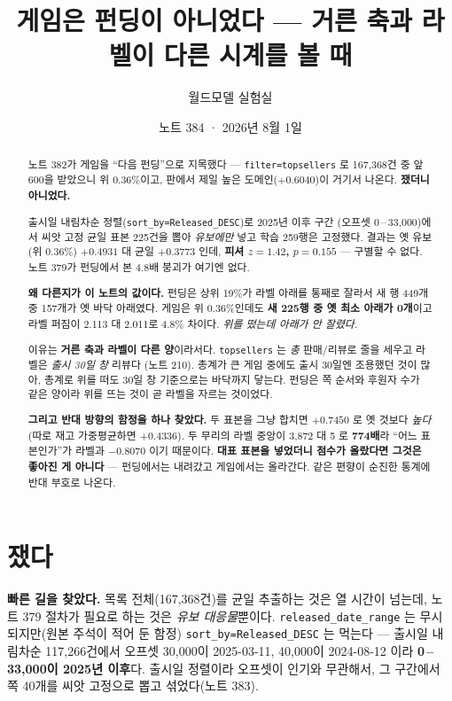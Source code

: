 \documentclass[11pt]{article}
\begin{document}
\title{게임은 펀딩이 아니었다 --- 거른 축과 라벨이 다른 시계를 볼 때}
\author{월드모델 실험실}
\date{노트 384 · 2026년 8월 1일}
\maketitle

\begin{abstract}
노트 382가 게임을 ``다음 펀딩''으로 지목했다 ---
\texttt{filter=topsellers} 로 167,368건 중 앞 600을 받았으니 위 0.36\%이고,
판에서 제일 높은 도메인($+0.6040$)이 거기서 나온다. \textbf{쟀더니 아니었다.}

출시일 내림차순 정렬(\texttt{sort\_by=Released\_DESC})로 2025년 이후 구간
(오프셋 0\,--\,33,000)에서 씨앗 고정 균일 표본 225건을 뽑아 \emph{유보에만}
넣고 학습 259행은 고정했다. 결과는 옛 유보(위 0.36\%) $+0.4931$ 대 균일
$+0.3773$ 인데, \textbf{피셔 $z=1.42$, $p=0.155$} --- 구별할 수 없다.
노트 379가 펀딩에서 본 4.8배 붕괴가 여기엔 없다.

\textbf{왜 다른지가 이 노트의 값이다.} 펀딩은 상위 19\%가 라벨 아래를
통째로 잘라서 새 행 449개 중 157개가 옛 바닥 아래였다. 게임은 위
0.36\%인데도 \textbf{새 225행 중 옛 최소 아래가 0개}이고 라벨 퍼짐이
2.113 대 2.011로 4.8\% 차이다. \emph{위를 떴는데 아래가 안 잘렸다.}

이유는 \textbf{거른 축과 라벨이 다른 양}이라서다. \texttt{topsellers} 는
\emph{총} 판매/리뷰로 줄을 세우고 라벨은 \emph{출시 30일 창} 리뷰다
(노트 210). 총계가 큰 게임 중에도 출시 30일엔 조용했던 것이 많아, 총계로
위를 떠도 30일 창 기준으로는 바닥까지 닿는다. 펀딩은 쪽 순서와 후원자 수가
같은 양이라 위를 뜨는 것이 곧 라벨을 자르는 것이었다.

\textbf{그리고 반대 방향의 함정을 하나 찾았다.} 두 표본을 그냥 합치면
$\mathbf{+0.7450}$ 로 옛 것보다 \emph{높다}(따로 재고 가중평균하면
$+0.4336$). 두 무리의 라벨 중앙이 3,872 대 5 로 \textbf{774배}라
``어느 표본인가''가 라벨과 $-0.8070$ 이기 때문이다. \textbf{대표 표본을
넣었더니 점수가 올랐다면 그것은 좋아진 게 아니다} --- 펀딩에서는 내려갔고
게임에서는 올라간다. 같은 편향이 순진한 통계에 반대 부호로 나온다.
\end{abstract}

\section{쟀다}

\textbf{빠른 길을 찾았다.} 목록 전체(167,368건)를 균일 추출하는 것은 열
시간이 넘는데, 노트 379 절차가 필요로 하는 것은 \emph{유보 대응물}뿐이다.
\texttt{released\_date\_range} 는 무시되지만(원본 주석이 적어 둔 함정)
\texttt{sort\_by=Released\_DESC} 는 먹는다 --- 출시일 내림차순 117,266건에서
오프셋 30,000이 2025-03-11, 40,000이 2024-08-12 이라 \textbf{0\,--\,33,000이
2025년 이후}다. 출시일 정렬이라 오프셋이 인기와 무관해서, 그 구간에서 쪽
40개를 씨앗 고정으로 뽑고 섞었다(노트 383).
\end{document}
